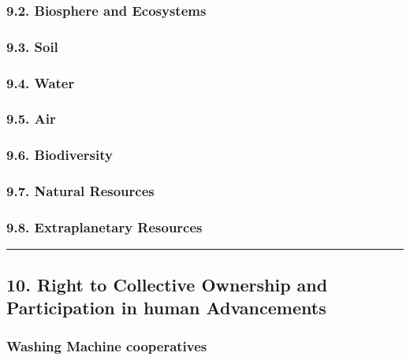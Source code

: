 \subsubsection{9.2. Biosphere and
Ecosystems}\label{biosphere-and-ecosystems}

\subsubsection{9.3. Soil}\label{soil}

\subsubsection{9.4. Water}\label{water}

\subsubsection{9.5. Air}\label{air}

\subsubsection{9.6. Biodiversity}\label{biodiversity}

\subsubsection{9.7. Natural Resources}\label{natural-resources}

\subsubsection{9.8. Extraplanetary
Resources}\label{extraplanetary-resources}

\begin{center}\rule{0.5\linewidth}{0.5pt}\end{center}

\subsection{10. Right to Collective Ownership and Participation in human
Advancements}\label{right-to-collective-ownership-and-participation-in-human-advancements}

\subsubsection{Washing Machine
cooperatives}\label{washing-machine-cooperatives}

